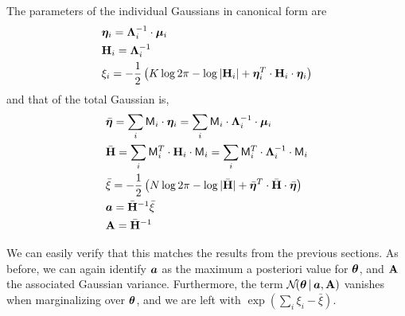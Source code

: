 The parameters of the individual Gaussians in canonical form are
\begin{eqnarray}
&\boldsymbol{\eta}_i = \mathbf{\Lambda}_i^{-1} \cdot \boldsymbol{\mu}_i \\
&\mathbf{H}_i = \mathbf{\Lambda}_i^{-1}\\
&\xi_i = -\frac{1}{2}\left( K\log 2\pi -\log|\mathbf{H}_i| + \boldsymbol{\eta}_i^T \cdot \mathbf{H}_i\cdot \boldsymbol{\eta}_i \right) 
\end{eqnarray}
and that of the total Gaussian is,
\begin{eqnarray}
&\bar{\boldsymbol{\eta}} = \sum_i \mathsf{M}_i \cdot \boldsymbol{\eta}_i = \sum_i \mathsf{M}_i \cdot  \mathbf{\Lambda}_i^{-1} \cdot \boldsymbol{\mu}_i  \\
&\bar{\mathbf{H}} = \sum_i  \mathsf{M}_i^T\cdot \mathbf{H}_i\cdot \mathsf{M}_i = \sum_i  \mathsf{M}_i^T\cdot \mathbf{\Lambda}_i^{-1}\cdot \mathsf{M}_i \\ 
& \bar{\xi} =  -\frac{1}{2}\left( N\log 2\pi -\log|\bar{\mathbf{H}} | + \bar{\boldsymbol{\eta}}^T \cdot \bar{\mathbf{H}}\cdot \bar{\boldsymbol{\eta}} \right)\\
&\boldsymbol{a} =  \bar{\mathbf{H}}^{-1} \bar{\xi} \\
&\mathbf{A} = \bar{\mathbf{H}}^{-1} 
\end{eqnarray}

We can easily verify that this matches the results from the previous sections.
As before, we can again identify $\boldsymbol{a}$ as the maximum a posteriori value for $\boldsymbol{\theta}$, and $\mathbf{A}$ the associated Gaussian variance.  
Furthermore, the term $ \mathcal{N}\!(\boldsymbol{\theta}\,|\,\boldsymbol{a},\mathbf{A}) $ vanishes when marginalizing over $\boldsymbol{\theta}$, and we are left with $ \exp\left(\textstyle{\sum_i} \xi_i - \bar{\xi} \right)$.





